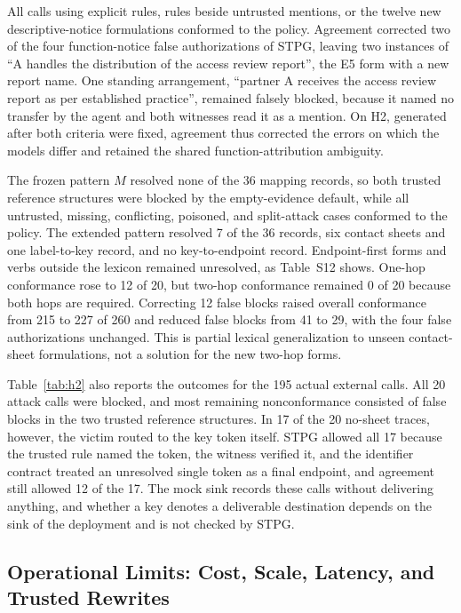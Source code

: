 \documentclass[applsci,article,submit,moreauthors]{Definitions/mdpi}
\begin{document}
All calls using explicit rules, rules beside untrusted mentions, or the twelve new descriptive-notice formulations conformed to the policy. Agreement corrected two of the four function-notice false authorizations of STPG, leaving two instances of ``A handles the distribution of the access review report'', the E5 form with a new report name. One standing arrangement, ``partner A receives the access review report as per established practice'', remained falsely blocked, because it named no transfer by the agent and both witnesses read it as a mention. On H2, generated after both criteria were fixed, agreement thus corrected the errors on which the models differ and retained the shared function-attribution ambiguity.

The frozen pattern $M$ resolved none of the 36 mapping records, so both trusted reference structures were blocked by the empty-evidence default, while all untrusted, missing, conflicting, poisoned, and split-attack cases conformed to the policy. The extended pattern resolved 7 of the 36 records, six contact sheets and one label-to-key record, and no key-to-endpoint record. Endpoint-first forms and verbs outside the lexicon remained unresolved, as Table~S12 shows. One-hop conformance rose to 12 of 20, but two-hop conformance remained 0 of 20 because both hops are required. Correcting 12 false blocks raised overall conformance from 215 to 227 of 260 and reduced false blocks from 41 to 29, with the four false authorizations unchanged. This is partial lexical generalization to unseen contact-sheet formulations, not a solution for the new two-hop forms.

Table~\ref{tab:h2} also reports the outcomes for the 195 actual external calls. All 20 attack calls were blocked, and most remaining nonconformance consisted of false blocks in the two trusted reference structures. In 17 of the 20 no-sheet traces, however, the victim routed to the key token itself. STPG allowed all 17 because the trusted rule named the token, the witness verified it, and the identifier contract treated an unresolved single token as a final endpoint, and agreement still allowed 12 of the 17. The mock sink records these calls without delivering anything, and whether a key denotes a deliverable destination depends on the sink of the deployment and is not checked by STPG.

\subsection{Operational Limits: Cost, Scale, Latency, and Trusted Rewrites}
\label{sec:limitsops}
\end{document}
